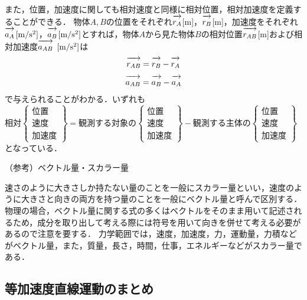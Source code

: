 また，位置，加速度に関しても相対速度と同様に相対位置，相対加速度を定義することができる．
物体$A,B$の位置をそれぞれ$\overrightarrow{r_A\mathstrut}$\hspace{1mm}[m]，$\overrightarrow{r_B\mathstrut}$\hspace{1mm}[m]，加速度をそれぞれ$\overrightarrow{a_A\mathstrut}$\hspace{1mm}${\rm [m/s^2]}$，$\overrightarrow{a_B\mathstrut}$\hspace{1mm}${\rm [m/s^2]}$とすれば，物体$A$から見た物体$B$の相対位置$\overrightarrow{r_{AB}\mathstrut}$\hspace{1mm}[m]および相対加速度$\overrightarrow{a_{AB}\mathstrut}$ \hspace{1mm}${\rm [m/s^2]}$は
\[ \overrightarrow{r_{AB}\mathstrut}=\overrightarrow{r_B\mathstrut}-\overrightarrow{r_A\mathstrut}\]
\[ \overrightarrow{a_{AB}\mathstrut}=\overrightarrow{a_B\mathstrut}-\overrightarrow{a_A\mathstrut}\]
で与えられることがわかる．いずれも\\
\hspace{10mm}$相対\left\{
\begin{array}{l}
位置\\
速度\\
加速度
\end{array}
\right\}
=観測する対象の
\left\{
\begin{array}{l}
位置\\
速度\\
加速度
\end{array}
\right\}
-観測する主体の
\left\{
\begin{array}{l}
位置\\
速度\\
加速度
\end{array}
\right\}$\\
となっている．

（参考）ベクトル量・スカラー量\hrulefill 

速さのように大きさしか持たない量のことを一般にスカラー量といい，速度のように大きさと向きの両方を持つ量のことを一般にベクトル量と呼んで区別する．物理の場合，ベクトル量に関する式の多くはベクトルをそのまま用いて記述されるため，成分を取り出して考える際には符号を用いて向きを併せて考える必要があるので注意を要する．
力学範囲では，速度，加速度，力，運動量，力積などがベクトル量，また，質量，長さ，時間，仕事，エネルギーなどがスカラー量である．

\hrulefill

\subsection{等加速度直線運動のまとめ}
 
